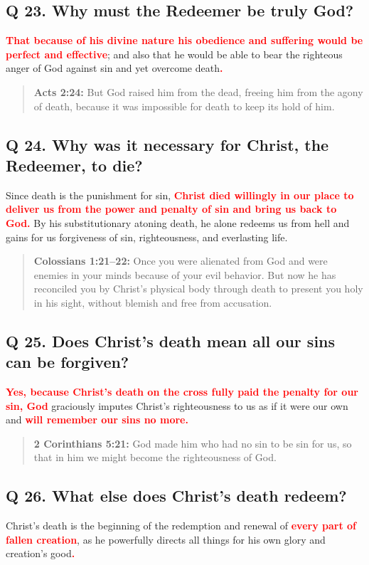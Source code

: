 \documentclass[]{memoir}
\newcommand\Children[1]{\textbf{\textcolor{red}{#1}}}
\newcommand\Quote[2]{\begin{quote}{\textbf{#1:}{ #2}}\end{quote}}
\begin{document}
\subsection{Q 23. Why must the Redeemer be truly God?}
\Children{That because of his divine nature his obedience and suffering would be perfect and effective}; and also that he would be able to bear the righteous anger of God against sin and yet overcome death\Children{.}

\Quote{Acts 2:24}{But God raised him from the dead, freeing him from the agony of death, because it was impossible for death to keep its hold of him.}

\subsection{Q 24. Why was it necessary for Christ, the Redeemer, to die?}
Since death is the punishment for sin, \Children{Christ died willingly in our place to deliver us from the power and penalty of sin and bring us back to God.} By his substitutionary atoning death, he alone redeems us from hell and gains for us forgiveness of sin, righteousness, and everlasting life.

\Quote{Colossians 1:21--22}{Once you were alienated from God and were enemies in your minds because of your evil behavior. But now he has reconciled you by Christ's physical body through death to present you holy in his sight, without blemish and free from accusation.}

\subsection{Q 25. Does Christ's death mean all our sins can be forgiven?}
\Children{Yes, because Christ's death on the cross fully paid the penalty for our sin, God} graciously imputes Christ's righteousness to us as if it were our own and \Children{will remember our sins no more.}

\Quote{2 Corinthians 5:21}{God made him who had no sin to be sin for us, so that in him we might become the righteousness of God.}

\subsection{Q 26. What else does Christ's death redeem?}
Christ's death is the beginning of the redemption and renewal of \Children{every part of fallen creation}, as he powerfully directs all things for his own glory and creation's good\Children{.}
\end{document}
